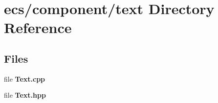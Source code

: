 \section{ecs/component/text Directory Reference}
\label{dir_6fa6056e27490cdb8c2200c7ff1e1f39}
\subsection*{Files}
\begin{DoxyCompactItemize}
\item 
file \textbf{ Text.\+cpp}
\item 
file \textbf{ Text.\+hpp}
\end{DoxyCompactItemize}
